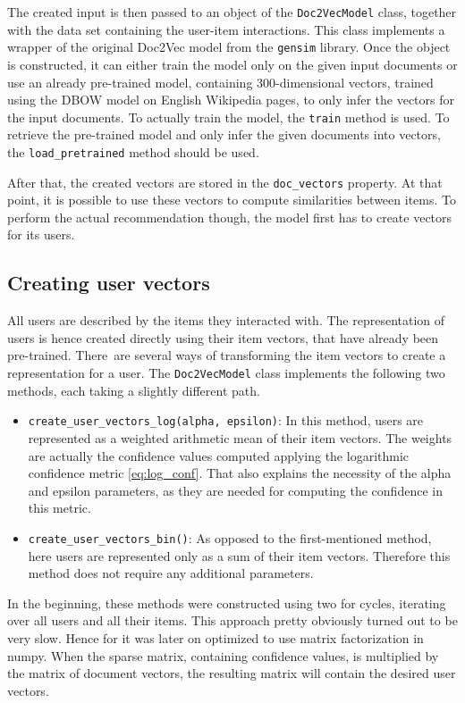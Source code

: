 The created input is then passed to an object of the \texttt{Doc2VecModel} class, together with the data set containing the user-item interactions. This class implements a wrapper of the original Doc2Vec model from the \texttt{gensim} library. Once the object is constructed, it can either train the model only on the given input documents or use an already pre-trained model, containing 300-dimensional vectors, trained using the DBOW model on English Wikipedia pages, to only infer the vectors for the input documents. To actually train the model, the \texttt{train} method is used. To retrieve the pre-trained model and only infer the given documents into vectors, the \texttt{load\_pretrained} method should be used. 

After that, the created vectors are stored in the \texttt{doc\_vectors} property. At that point, it is possible to use these vectors to compute similarities between items. To perform the actual recommendation though, the model first has to create vectors for its users.

\subsection*{Creating user vectors}
All users are described by the items they interacted with. The representation of users is hence created directly using their item vectors, that have already been pre-trained. There~are several ways of transforming the item vectors to create a representation for a user. The \texttt{Doc2VecModel} class implements the following two methods, each taking a slightly different path.

\begin{itemize}
    \item \texttt{create\_user\_vectors\_log(alpha, epsilon)}: In this method, users are represented as a weighted arithmetic mean of their item vectors. The weights are actually the confidence values computed applying the logarithmic confidence metric \ref{eq:log_conf}. That also explains the necessity of the alpha and epsilon parameters, as they are needed for computing the confidence in this metric.
    
    \item \texttt{create\_user\_vectors\_bin()}: As opposed to the first-mentioned method, here users are represented only as a sum of their item vectors. Therefore this method does not require any additional parameters.
\end{itemize}
In the beginning, these methods were constructed using two for cycles, iterating over all users and all their items. This approach pretty obviously turned out to be very slow. Hence for it was later on optimized to use matrix factorization in numpy. When the sparse matrix, containing confidence values, is multiplied by the matrix of document vectors, the resulting matrix will contain the desired user vectors.

